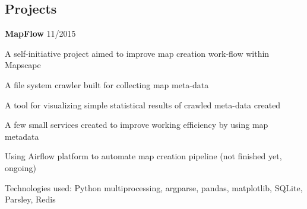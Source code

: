\documentclass[margin,line]{resume}
\begin{document}
\begin{resume}

    \section{\myheadingstyle Projects}

    \textbf{MapFlow} \hfill 11/2015 \vspace{-3mm}\\\vspace{-1mm}%
      \begin{list2}
       \item A self-initiative project aimed to improve map creation work-flow within Mapscape
       \item A file system crawler built for collecting map meta-data
       \item A tool for visualizing simple statistical results of crawled meta-data created
       \item A few small services created to improve working efficiency by using map metadata
       \item Using Airflow platform to automate map creation pipeline (not finished yet, ongoing)
       \item Technologies used: Python multiprocessing, argparse, pandas, matplotlib, SQLite, Parsley, Redis
      \end{list2}


\end{resume}
\end{document}
